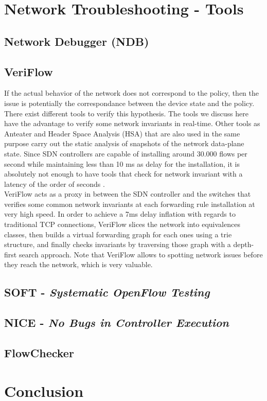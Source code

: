 \documentclass[10pt,article]{IEEEtran}
\begin{document}
\section{Network Troubleshooting - Tools}

\subsection{Network Debugger (NDB)}

\subsection{VeriFlow}
If the actual behavior of the network does not correspond to the policy, then the issue is potentially the correspondance between the device state and the policy. There exist different tools to verify this hypothesis. The tools we discuss here have the advantage to verify some network invariants in real-time. Other tools as Anteater and Header Space Analysis (HSA) that are also used in the same purpose carry out the static analysis of snapshots of the network data-plane state\cite{Kazemian:2012:HSA:2228298.2228311}\cite{Mai:2011:DDP:2018436.2018470}. Since SDN controllers are capable of installing around 30.000 flows per second while maintaining less than 10 ms as delay for the installation, it is absolutely not enough to have tools that check for network invariant with a latency of the order of seconds \cite{Khurshid:2013:VVN:2482626.2482630}.\\
VeriFlow acts as a proxy in between the SDN controller and the switches that verifies some common network invariants at each forwarding rule installation at very high speed. In order to achieve a 7ms delay inflation with regards to traditional TCP connections, VeriFlow slices the network into equivalences classes, then builds a virtual forwarding graph for each ones using a trie structure, and finally checks invariants by traversing those graph with a depth-first search approach. Note that VeriFlow allows to spotting network issues before they reach the network, which is very valuable.

\subsection{SOFT - \textit{Systematic OpenFlow Testing}}

\subsection{NICE - \textit{No Bugs in Controller Execution}}

\subsection{FlowChecker}



\section{Conclusion}




\end{document}
